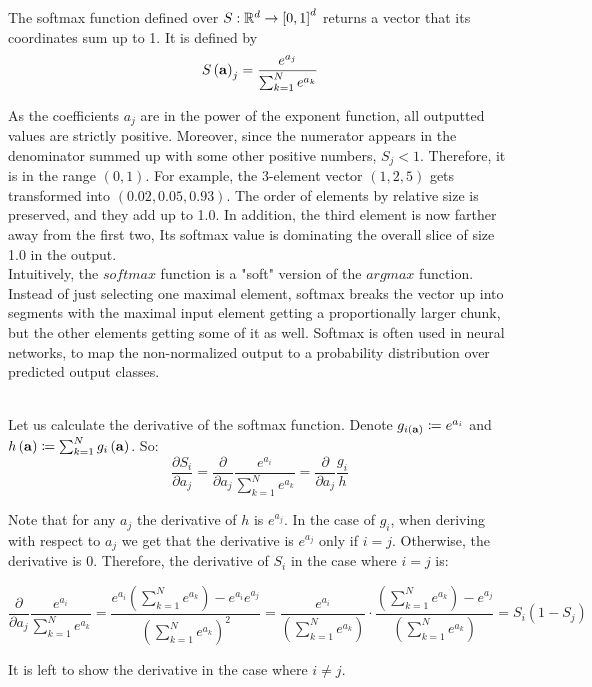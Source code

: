 \begin{example}
The softmax function defined over $S:\mathbb{R}^d \rightarrow \left[0,1\right]^d$ returns a vector that its coordinates sum up to 1. It is defined by $$S\left(\mathbf{a}\right)_{j}=\frac{e^{a_{j}}}{\sum_{k=1}^{N}e^{a_{k}}}$$

As the coefficients $a_j$ are in the power of the exponent function, all outputted values are strictly positive. Moreover, since the numerator appears in the denominator summed up with some other positive numbers, $S_{j}<1$. Therefore, it is in the range $\left(0,1\right)$. For example, the 3-element vector $(1, 2, 5)$ gets transformed into $(0.02, 0.05, 0.93)$. The order of elements by relative size is preserved, and they add up to 1.0. In addition, the third element is now farther away from the first two, Its softmax value is dominating the overall slice of size 1.0 in the output. ~\\

Intuitively, the $softmax$ function is a "soft" version of the $argmax$ function. Instead of just selecting one maximal element, softmax breaks the vector up into segments with the maximal input element getting a proportionally larger chunk, but the other elements getting some of it as well. Softmax is often used in neural networks, to map the non-normalized output to a probability distribution over predicted output classes.

~\\ Let us calculate the derivative of the softmax function. Denote $g_{i\left(\mathbf{a}\right)}\coloneqq e^{a_{i}}$  and $h\left(\mathbf{a}\right)\coloneqq \sum_{k=1}^{N}g_i\left(\mathbf{a}\right)$. So:
$$\frac{\partial S_{i}}{\partial a_{j}}=\frac{\partial}{\partial a_{j}}\frac{e^{a_{i}}}{\sum_{k=1}^{N}e^{a_{k}}}=\frac{\partial}{\partial a_{j}}\frac{g_{i}}{h}$$

Note that for any $a_j$ the derivative of $h$ is $e^{a_j}$. In the case of $g_i$, when deriving with respect to $a_j$ we get that the derivative is $e^{a_j}$ only if $i=j$. Otherwise, the derivative is $0$. Therefore, the derivative of $S_i$ in the case where $i=j$ is:

$$\frac{\partial}{\partial a_{j}}\frac{e^{a_{i}}}{\sum_{k=1}^{N}e^{a_{k}}} = \frac{e^{a_{i}}({\sum_{k=1}^{N}e^{a_{k}}}) - e^{a_{i}} e^{a_{j}}} {({\sum_{k=1}^{N}e^{a_{k}}})^{2}}=\frac{e^{a_{i}}}{({\sum_{k=1}^{N}e^{a_{k}}})}\cdot\frac{({\sum_{k=1}^{N}e^{a_{k}}})-e^{a_{j}}}{({\sum_{k=1}^{N}e^{a_{k}}})}=S_{i}\left(1-S_{j}\right)$$

It is left to show the derivative in the case where $i\neq j$.
\end{example}

